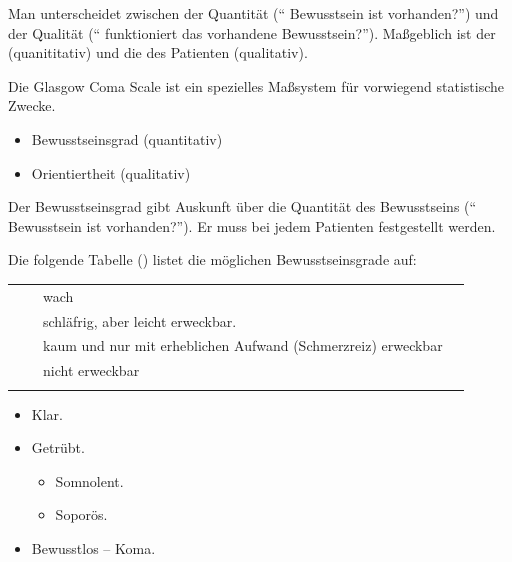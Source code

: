 {
Man unterscheidet zwischen der Quantität ("` Bewusstsein ist
vorhanden?"') und der Qualität ("` funktioniert das vorhandene
Bewusstsein?"'). Maßgeblich ist der  (quanititativ) und
die  des Patienten (qualitativ). 

Die Glasgow Coma Scale ist ein spezielles Maßsystem für vorwiegend statistische
Zwecke. 
}{
\begin{itemize}
  \item Bewusstseinsgrad (quantitativ)
  \item Orientiertheit (qualitativ)
\end{itemize}
}{}{}{}

{
\label{topic:bewusstseinsstoerung-grade}

Der Bewusstseinsgrad gibt Auskunft über die Quantität des Bewusstseins ("` Bewusstsein ist
vorhanden?"'). Er muss bei jedem Patienten festgestellt werden.

Die folgende Tabelle () listet die möglichen
Bewusstseinsgrade auf:

\noindent\begin{minipage}{\linewidth}

\begin{tabulary}{\linewidth}{LLLL}
\addlinespace
{}
 &
 &
 wach
 &
\\\addlinespace
{}
&
\noindent{} 
 &
schläfrig, aber leicht erweckbar.
 &
\\
 &
\noindent{} 
 &
 kaum und nur mit erheblichen Aufwand (Schmerzreiz)
 erweckbar 
 &
\noindent{}
\\\addlinespace
{}
 &
\noindent{}
 &
 nicht erweckbar
 &
\noindent{}
\\\addlinespace\bottomrule
\end{tabulary}
\end{minipage}

}{
\begin{itemize}
  \item Klar.
  \item Getrübt.
  \begin{itemize}
    \item Somnolent.
    \item Soporös.
  \end{itemize}
  \item Bewusstlos -- Koma.
\end{itemize}

}{}{}{}

